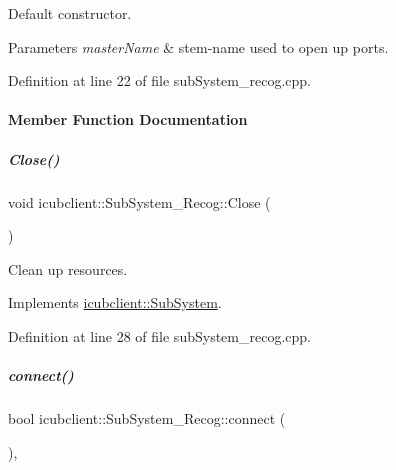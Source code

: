 Default constructor. 


\begin{DoxyParams}{Parameters}
{\em master\+Name} & stem-\/name used to open up ports. \\
\hline
\end{DoxyParams}


Definition at line 22 of file sub\+System\+\_\+recog.\+cpp.



\paragraph{Member Function Documentation}
\mbox{\label{group__icubclient__subsystems_a8f41f3c801e0d0b705927dbc56959137}} 
\subparagraph{\texorpdfstring{Close()}{Close()}}
{\footnotesize\ttfamily void icubclient\+::\+Sub\+System\+\_\+\+Recog\+::\+Close (\begin{DoxyParamCaption}{ }\end{DoxyParamCaption})\hspace{0.3cm}{\ttfamily [virtual]}}



Clean up resources. 



Implements \hyperlink{group__icubclient__subsystems_af327c56ad0d33aada77f825d96fb47f2}{icubclient\+::\+Sub\+System}.



Definition at line 28 of file sub\+System\+\_\+recog.\+cpp.

\mbox{\label{group__icubclient__subsystems_a98acf2fdda5a595803ce2e75e045a56f}} 
\subparagraph{\texorpdfstring{connect()}{connect()}}
{\footnotesize\ttfamily bool icubclient\+::\+Sub\+System\+\_\+\+Recog\+::connect (\begin{DoxyParamCaption}{ }\end{DoxyParamCaption})\hspace{0.3cm}{\ttfamily [protected]}, {\ttfamily [virtual]}}




